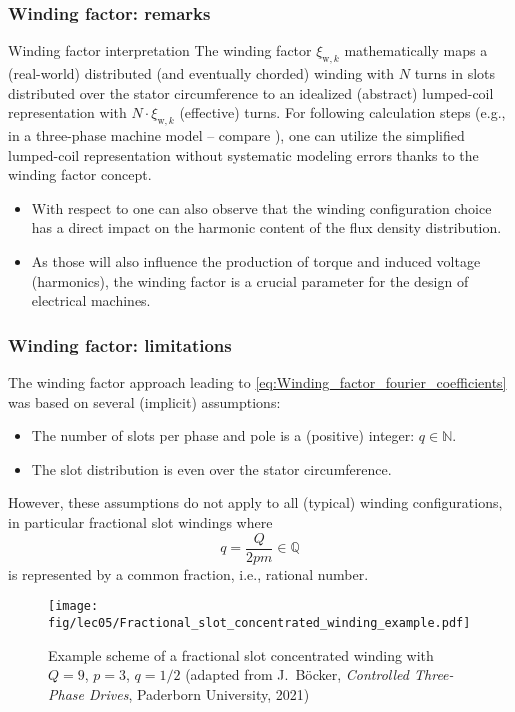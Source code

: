 \begin{frame}
	\frametitle{Winding factor: remarks}
    \begin{varblock}{Winding factor interpretation}
        The winding factor $\xi_{\mathrm{w},k}$ mathematically maps a (real-world) distributed (and eventually chorded) winding with $N$ turns in slots distributed over the stator circumference to an idealized (abstract) lumped-coil representation with $N \cdot \xi_{\mathrm{w},k}$ (effective) turns. For following calculation steps (e.g., in a three-phase machine model -- compare ), one can utilize the simplified lumped-coil representation without systematic modeling errors thanks to the winding factor concept.
    \end{varblock}
    \begin{itemize}
        \item<2-> With respect to  one can also observe that the winding configuration choice has a direct impact on the harmonic content of the flux density distribution.
        \item<3-> As those will also influence the production of torque and induced voltage (harmonics), the winding factor is a crucial parameter for the design of electrical machines.
    \end{itemize}
\end{frame}

\begin{frame}
	\frametitle{Winding factor: limitations}
    \onslide<+->
    The winding factor approach leading to \eqref{eq:Winding_factor_fourier_coefficients} was based on several (implicit) assumptions:
    \begin{itemize}
        \item<+-> The number of slots per phase and pole is a (positive) integer: $q \in \mathbb{N}$.
        \item<+-> The slot distribution is even over the stator circumference.
    \end{itemize}
    \onslide<+->
    However, these assumptions do not apply to all (typical) winding configurations, in particular fractional slot windings where $$q=\frac{Q}{2 p m} \in \mathbb{Q}$$ is represented by a common fraction, i.e., rational number. 
    \begin{figure}
        \centering
        \texttt{[image: fig/lec05/Fractional\_slot\_concentrated\_winding\_example.pdf]}
        \caption{Example scheme of a fractional slot concentrated winding with $Q=9$, $p = 3$, $q=1/2$ (adapted from J.~B\"ocker, \textit{Controlled Three-Phase Drives}, Paderborn University, 2021)}
        \label{fig:Fractional_slot_concentrated_winding_example}
    \end{figure}
\end{frame}

